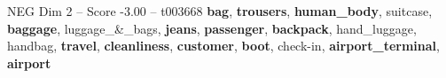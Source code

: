 \begin{textsample}{NEG Dim 2 – Score -3.00 – t003668}  \label{ex:f2_neg_023}
\textbf{bag}, \textbf{trousers}, \textbf{human\_body}, suitcase, \textbf{baggage}, luggage\_\&\_bags, \textbf{jeans}, \textbf{passenger}, \textbf{backpack}, hand\_luggage, handbag, \textbf{travel}, \textbf{cleanliness}, \textbf{customer}, \textbf{boot}, check-in, \textbf{airport\_terminal}, \textbf{airport}

\end{textsample}
